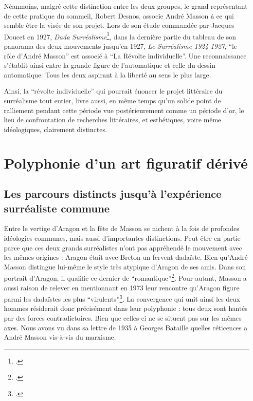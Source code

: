 	Néanmoins, malgré cette distinction entre les deux groupes, le grand représentant de cette pratique du sommeil, Robert Desnos, associe André Masson à ce qui semble être la visée de son projet. Lors de son étude commandée par Jacques Doucet en 1927, \emph{Dada Surréalisme}\footcite[p152]{desnos}, dans la dernière partie du tableau de son panorama des deux mouvements jusqu’en 1927, \emph{Le Surréalisme 1924-1927}, \enquote{le rôle d’André Masson} est associé à \enquote{La Révolte individuelle}. Une reconnaissance s’établit ainsi entre la grande figure de l’automatique et celle du dessin automatique. Tous les deux aspirant à la liberté au sens le plus large. 

	Ainsi, la \enquote{révolte individuelle} qui pourrait énoncer le projet littéraire du surréalisme tout entier, livre aussi, en même temps qu’un solide point de ralliement pendant cette période vue postérieurement comme un période d’or, le lieu de confrontation de recherches littéraires, et esthétiques, voire même idéologiques, clairement distinctes. 

\section{Polyphonie d'un art figuratif dérivé}

\subsection{Les parcours distincts jusqu'à l'expérience surréaliste commune}


Entre le vertige d’Aragon et la fête de Masson se nichent à la fois de profondes idéologies communes, mais aussi d'importantes distinctions. Peut-être en partie parce que ces deux grands surréalistes n’ont pas appréhendé le mouvement avec les mêmes origines : Aragon était avec Breton un fervent dadaïste. Bien qu’André Masson distingue lui-même le style très atypique d’Aragon de ses amis. Dans son portrait d’Aragon, il qualifie ce dernier de \enquote{romantique}\footcite{desnos}. Pour autant, Masson a aussi raison de relever en mentionnant en 1973 leur rencontre qu’Aragon figure parmi les dadaïstes les plus \enquote{virulents}\footcite[p84]{rebelle}. La convergence qui unit ainsi les deux hommes résiderait donc précisément dans leur polyphonie : tous deux sont hantés par des forces contradictoires. Bien que celles-ci ne se situent pas sur les mêmes axes. Nous avons vu dans sa lettre de 1935 à Georges Bataille quelles réticences a André Masson vis-à-vis du marxisme. 

